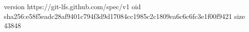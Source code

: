 version https://git-lfs.github.com/spec/v1
oid sha256:e58f5eadc28af9401c794f3d9d17084cc1985c2c1809ea6c6c6fc3e1f00f9421
size 43848
